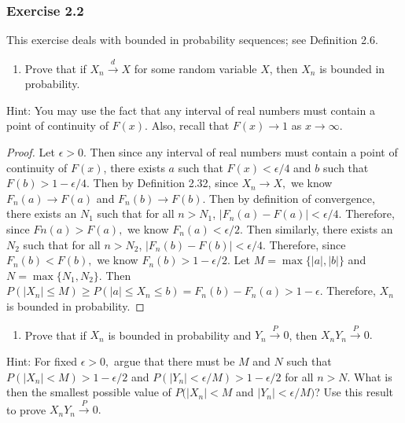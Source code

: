 \documentclass[12pt,]{article}
\providecommand{\tightlist}{%
  \setlength{\itemsep}{0pt}\setlength{\parskip}{0pt}}
\begin{document}
\hypertarget{exercise-2.2}{%
\subsubsection{Exercise 2.2}\label{exercise-2.2}}

This exercise deals with bounded in probability sequences; see
Definition 2.6.

\begin{enumerate}
\def\labelenumi{(\alph{enumi})}
\tightlist
\item
  Prove that if \(X_n \overset{d}\rightarrow X\) for some random
  variable \(X\), then \(X_n\) is bounded in probability.
\end{enumerate}

Hint: You may use the fact that any interval of real numbers must
contain a point of continuity of \(F(x)\). Also, recall that
\(F(x)\rightarrow 1\) as \(x\rightarrow \infty.\)

\begin{proof}
Let $\epsilon > 0.$ Then since any interval of real numbers must contain a point of continuity of $F(x)$, there exists $a$ such that $F(x) < \epsilon/4$ and $b$ such that $F(b) > 1-\epsilon/4.$ Then by Definition 2.32, since $X_n \rightarrow X,$ we know $F_n(a)\rightarrow F(a)$ and $F_n(b)\rightarrow F(b).$ Then by definition of convergence, there exists an $N_1$ such that for all $n > N_1$, $|F_n(a)-F(a)| < \epsilon/4.$ Therefore, since $Fn(a)>F(a),$ we know $F_n(a) < \epsilon/2.$ Then similarly, there exists an $N_2$ such that for all $n>N_2$, $|F_n(b) -F(b)|<\epsilon/4.$ Therefore, since $F_n(b) < F(b),$ we know $F_n(b) > 1-\epsilon/2.$ Let $M = \max\{|a|,|b|\}$ and $N = \max\{N_1, N_2\}$. Then $P(|X_n|\le M) \ge P(|a|\le X_n \le b) = F_n(b) - F_n(a) > 1-\epsilon.$ Therefore, $X_n$ is bounded in probability.
\end{proof}

\begin{enumerate}
\def\labelenumi{(\alph{enumi})}
\setcounter{enumi}{1}
\tightlist
\item
  Prove that if \(X_n\) is bounded in probability and
  \(Y_n \overset{P}\rightarrow 0\), then
  \(X_nY_n\overset{P}\rightarrow 0.\)
\end{enumerate}

Hint: For fixed \(\epsilon > 0,\) argue that there must be \(M\) and
\(N\) such that \(P(|X_n|<M)>1-\epsilon/2\) and
\(P(|Y_n|<\epsilon/M)>1-\epsilon/2\) for all \(n>N.\) What is then the
smallest possible value of \(P(|X_n|<M\) and \(|Y_n|<\epsilon/M)\)? Use
this result to prove \(X_nY_n\overset{P}\rightarrow 0.\)
\end{document}
